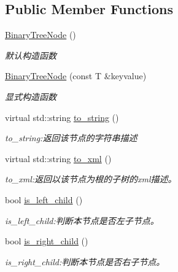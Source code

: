 \subsection*{Public Member Functions}
\begin{DoxyCompactItemize}
\item 
\hyperlink{struct_introduction_to_algorithm_1_1_tree_algorithm_1_1_binary_tree_node_adec2f420e4bfbf9e3c71079cfbe565a4}{Binary\+Tree\+Node} ()
\begin{DoxyCompactList}\small\item\em 默认构造函数 \end{DoxyCompactList}\item 
\hyperlink{struct_introduction_to_algorithm_1_1_tree_algorithm_1_1_binary_tree_node_ad27c56e984010e4cbb304429e86f78e4}{Binary\+Tree\+Node} (const T \&keyvalue)
\begin{DoxyCompactList}\small\item\em 显式构造函数 \end{DoxyCompactList}\item 
virtual std\+::string \hyperlink{struct_introduction_to_algorithm_1_1_tree_algorithm_1_1_binary_tree_node_accc2e6dd939ba5be9b88431d2b51ec3d}{to\+\_\+string} ()
\begin{DoxyCompactList}\small\item\em to\+\_\+string\+:返回该节点的字符串描述 \end{DoxyCompactList}\item 
virtual std\+::string \hyperlink{struct_introduction_to_algorithm_1_1_tree_algorithm_1_1_binary_tree_node_a4b6e824757793c958982654a52d70f4d}{to\+\_\+xml} ()
\begin{DoxyCompactList}\small\item\em to\+\_\+xml\+:返回以该节点为根的子树的{\ttfamily xml}描述。 \end{DoxyCompactList}\item 
bool \hyperlink{struct_introduction_to_algorithm_1_1_tree_algorithm_1_1_binary_tree_node_a23dfcff4adbb1fba70296eb25fbac3cb}{is\+\_\+left\+\_\+child} ()
\begin{DoxyCompactList}\small\item\em is\+\_\+left\+\_\+child\+:判断本节点是否左子节点。 \end{DoxyCompactList}\item 
bool \hyperlink{struct_introduction_to_algorithm_1_1_tree_algorithm_1_1_binary_tree_node_a3147815d63a639a081d5dbea3359fc1b}{is\+\_\+right\+\_\+child} ()
\begin{DoxyCompactList}\small\item\em is\+\_\+right\+\_\+child\+:判断本节点是否右子节点。 \end{DoxyCompactList}\end{DoxyCompactItemize}
